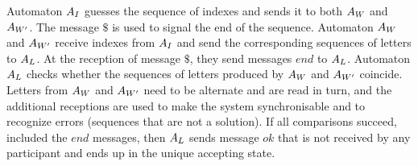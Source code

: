 Automaton $A_{I}$ guesses the sequence of indexes and sends it to both $A_{W}$ and $A_{W'}$. The message $\$$ is used to signal the end of the sequence.
Automaton $A_{W}$ and  $A_{W'}$ receive indexes  from $A_{I}$ and send the corresponding sequences of letters to $A_{L}$. At the reception of message $\$$, they send messages $end$ to $A_{L}$.
Automaton $A_{L}$ checks whether the sequences of letters produced by $A_{W}$ and $A_{W'}$ coincide. Letters from  $A_{W}$ and $A_{W'}$ need to be alternate and are read in turn, and the additional receptions are used to make the system synchronisable and to recognize errors (\ie sequences that are not a solution).
If all comparisons succeed, included the  $end$  messages, then $A_{L}$  sends message $ok$ that is not received by any participant and ends up in the unique accepting state.

